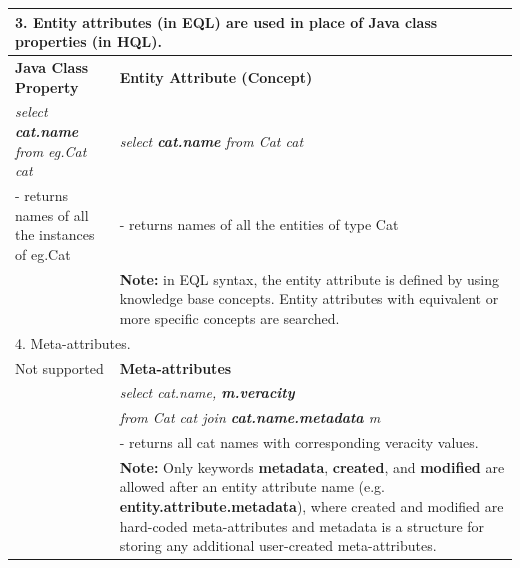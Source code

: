 \begin{table}[ht]
\begin{tabularx}{\linewidth}{|X|X|}
\multicolumn{2}{|p{0.9\linewidth}|}{3. Entity attributes (in EQL) are used in place of Java class properties (in HQL).} \\
\hline
\textbf{Java Class Property} & \textbf{Entity Attribute (Concept)} \\
\hdashline
\emph{select \textbf{cat.name} from eg.Cat cat} & \emph{select \textbf{cat.name} from Cat cat} \\
- returns names of all the instances of eg.Cat & - returns names of all the entities of type Cat \\
 & \textbf{Note:} in EQL syntax, the entity attribute is defined by using knowledge base concepts. Entity attributes with equivalent or more specific concepts are searched. \\
\hline

\multicolumn{2}{|p{0.9\linewidth}|}{4. Meta-attributes.} \\
\hline
Not supported & \textbf{Meta-attributes} \\
\hdashline
 & \emph{select cat.name, \textbf{m.veracity}} \\
 & \emph{from Cat cat join \textbf{cat.name.metadata} m} \\
 & - returns all cat names with corresponding veracity values. \\
 & \textbf{Note:} Only keywords \textbf{metadata}, \textbf{created}, and \textbf{modified} are allowed after an entity attribute name (e.g. \textbf{entity.attribute.metadata}), where created and modified are hard-coded meta-attributes and metadata is a structure for storing any additional user-created meta-attributes. \\
\hline
\end{tabularx}
\label{tab:hql_vs_eql}
\end{table}%



